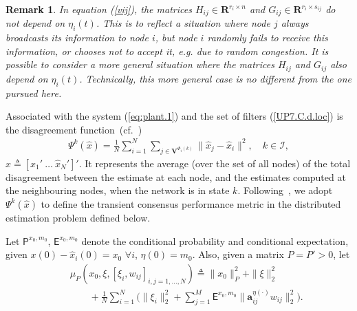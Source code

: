 \documentclass[a4paper,twocolumn]{autart}
\newtheorem{remark}{Remark}
\begin{document}
\begin{remark}\label{rem2}
In equation (\ref{vij}), the matrices $H_{ij}\in \mathbf{R}^{r_i\times n}$
and $G_{ij}\in \mathbf{R}^{r_i\times s_{ij}}$ do not depend on
  $\eta_i(t)$. This is
to reflect a situation where  
node $j$ \emph{always} broadcasts its information to node $i$, but node $i$
randomly fails to receive this information, or chooses not to accept it,
e.g. due to random congestion. 
It is possible to consider a
more general situation where the matrices $H_{ij}$ and $G_{ij}$ also depend on
$\eta_i(t)$. Technically, this more general case is no different from the one
pursued here.
\end{remark}

Associated with the system (\ref{eq:plant.1}) and the set of filters
(\ref{UP7.C.d.loc}) is
the disagreement function~(cf.~\cite{OM-2004})  
\begin{eqnarray}\label{disagr}
\Psi^k(\hat x)=\frac{1}{N} \sum_{i=1}^{N} \sum_{j\in
  \mathbf{V}^{\Phi_i(k)}}\|\hat x_j-\hat x_i\|^2, \quad 
k\in\mathcal{I}, 
\end{eqnarray}
$\hat x\triangleq [\hat x_1'~\ldots~\hat x_{N}']'$. 
It represents the average (over the set of all
nodes) of the total disagreement between the estimate at each node, and the
estimates computed at the neighbouring nodes, when the network is in state $k$. 
Following~\cite{U6}, we adopt $\Psi^k(\hat x)$ to define
the transient consensus performance metric in the distributed estimation problem
defined below.   

Let $\mathsf{P}^{x_0,m_0}$, $\mathsf{E}^{x_0,m_0}$ denote
the conditional probability and conditional expectation, given $x(0)-\hat
x_i(0)=x_0$ $\forall i$, $\eta(0)=m_0$.  Also, given a matrix $P=P'>0$, let
\begin{eqnarray*}
&&\mu_P(x_0,\xi,[\xi_i,w_{ij}]_{i,j=1,\ldots,N})\triangleq 
\|x_0\|^2_P + \|\xi\|_2^2 \nonumber\\
&&\qquad 
+\frac{1}{N} \sum_{i=1}^N\bigg(\|\xi_i\|_2^2
+\sum_{j=1}^M\mathsf{E}^{x_0,m_0}\|\mathbf{a}_{ij}^{\eta(\cdot)} w_{ij}\|^2_2\bigg). 
\nonumber
\end{eqnarray*}
\end{document}
